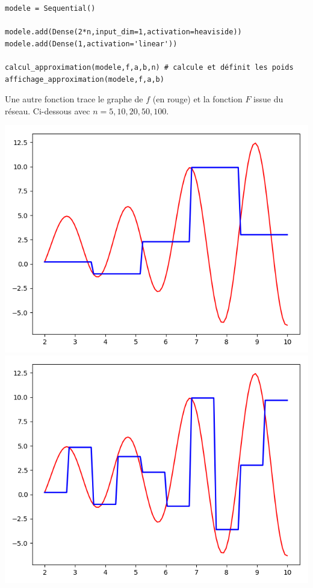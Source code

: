 \documentclass[11pt,class=report,crop=false]{standalone}
\begin{document}
\begin{lstlisting}
modele = Sequential()

modele.add(Dense(2*n,input_dim=1,activation=heaviside))
modele.add(Dense(1,activation='linear'))

calcul_approximation(modele,f,a,b,n) # calcule et définit les poids
affichage_approximation(modele,f,a,b)
\end{lstlisting}

Une autre fonction trace le graphe de $f$ (en rouge) et la fonction $F$ issue du réseau. Ci-dessous avec $n=5,10,20,50,100$.

\begin{center}
\includegraphics[scale=\myscale,scale=0.45]{figures/pythontf-1var-02a}
\includegraphics[scale=\myscale,scale=0.45]{figures/pythontf-1var-02b}

\end{center}
\end{document}
